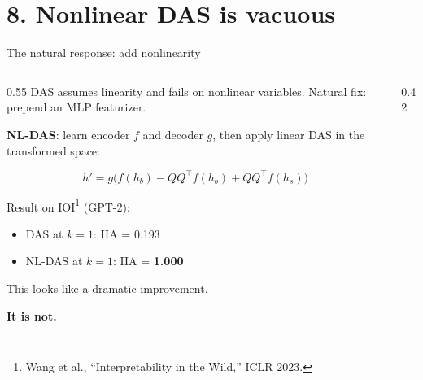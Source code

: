 \documentclass[aspectratio=169,11pt]{beamer}
\begin{document}
\hypertarget{sec8}{}
\section{8. Nonlinear DAS is vacuous}

\begin{frame}{The natural response: add nonlinearity}

\begin{columns}[T]
\begin{column}{0.55\textwidth}
{\small DAS assumes linearity and fails on nonlinear variables. Natural fix: prepend an MLP featurizer.}

\vspace{0.3em}
{\small \textbf{NL-DAS}: learn encoder $f$ and decoder $g$, then apply linear DAS in the transformed space:}

$$h' = g\bigl(f(h_b) - QQ^\top f(h_b) + QQ^\top f(h_s)\bigr)$$

\vspace{0.3em}
{\small Result on IOI\footnote{\tiny Wang et al., ``Interpretability in the Wild,'' ICLR 2023.} (GPT-2):}
\begin{itemize}
  \item {\small DAS at $k=1$: IIA = 0.193}
  \item {\small NL-DAS at $k=1$: IIA = \textbf{1.000}}
\end{itemize}

\vspace{0.3em}
{\small This looks like a dramatic improvement.}

\vspace{0.3em}
{\normalsize \textbf{It is not.}}
\end{column}
\begin{column}{0.42\textwidth}
\end{column}
\end{columns}
\end{frame}
\end{document}
